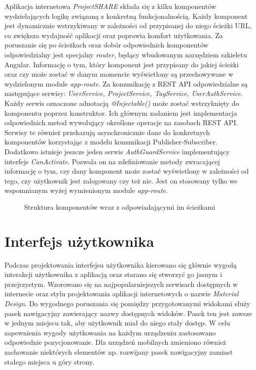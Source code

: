 Aplikacja internetowa \mbox{\textit{ProjectSHARE}} składa się z kilku komponentów wydzielających logikę związaną z konkretną funkcjonalnością. Każdy komponent jest dynamicznie wstrzykiwany w zależności od przypisanej do niego ścieżki URL, co zwiększa wydajność aplikacji oraz poprawia komfort użytkowania. Za poruszanie się po ścieżkach oraz dobór odpowiednich komponentów odpowiedzialny jest specjalny \textit{router}, będący wbudowanym narzędziem szkieletu Angular. Informację o tym, który komponent jest przypisany do jakiej ścieżki oraz czy może zostać w danym momencie wyświetlony są przechowywane w wydzielonym module \textit{app-route}. Za komunikację z REST API odpowiedzialne są następujące serwisy: \textit{UserService, ProjectService, TagService, UserAuthService}. Każdy serwis oznaczone adnotacją \textit{@Injectable()} może zostać wstrzyknięty do komponentu poprzez konstruktor. Ich głównym zadaniem jest implementacja odpowiednich metod wywołujący określone operacje na zasobach REST API. Serwisy te również przekazują asynchronicznie dane do konkretnych komponentów korzystając z modelu komunikacji Publisher-Subscriber. Dodatkowo istnieje jeszcze jeden serwis \textit{AuthGuardService} implementujący interfejs \textit{CanActivate}. Pozwala on na zdefiniowanie metody zwracającej informację o tym, czy dany komponent może zostać wyświetlony w zależności od tego, czy użytkownik jest zalogowany czy też nie. Jest on stosowany tylko we wspomnianym wyżej wymienionym module \textit{app-route}.

\begin{figure}[h!]
	\caption{Struktura komponentów wraz z odpowiadającymi im ścieżkami}
	\centering
\end{figure}


\section{Interfejs użytkownika}

Podczas projektowania interfejsu użytkownika kierowano się głównie wygodą interakcji użytkownika z aplikacją oraz starano się stworzyć go jasnym i przejrzystym. Wzorowano się na najpopularniejszych serwisach dostępnych w internecie oraz stylu projektowania aplikacji internetowych o nazwie \textit{Material Design}. Do wygodnego poruszania się pomiędzy przygotowanymi widokami służy pasek nawigacyjny zawierający nazwy dostępnych widoków. Pasek ten jest zawsze w jednym miejscu tak, aby użytkownik miał do niego stały dostęp. W celu zapewnienia wygody użytkowania na każdym urządzeniu zastosowano odpowiednie pozycjonowanie. Dla urządzeń mobilnych zmieniono również zachowanie niektórych elementów np. rozwijany pasek nawigacyjny zamiast stałego miejsca u góry strony. 

